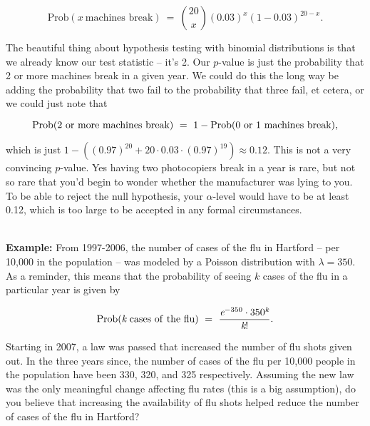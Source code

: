 \begin{equation*}

\textrm{Prob}(x \ \textrm{machines \ break}) \ = \  {{20}\choose{x}}(0.03)^x(1-0.03)^{20-x}.

\end{equation*}



The beautiful thing about hypothesis testing with binomial distributions is that we already know our test statistic -- it's 2.  Our $p$-value is just the probability that 2 or more machines break in a given year.  We could do this the long way be adding the probability that two fail to the probability that three fail, et cetera, or we could just note that

\begin{equation*}

\rm{Prob}(2 \ or \ more \ machines \ break) \ = \  1 - \rm{Prob}(0 \ or \ 1 \ machines \ break),

\end{equation*}

which is just $1-\left((0.97)^{20} + 20\cdot 0.03 \cdot (0.97)^{19}\right) \approx 0.12$.  This is not a very convincing $p$-value.  Yes having two photocopiers break in a year is rare, but not so rare that you'd begin to wonder whether the manufacturer was lying to you.  To be able to reject the null hypothesis, your $\alpha$-level would have to be at least 0.12, which is too large to be accepted in any formal circumstances.



\ \\



\textbf{Example:} \ex From 1997-2006, the number of cases of the flu in Hartford -- per 10,000 in the population -- was modeled by a Poisson distribution with $\lambda = 350$.  As a reminder, this means that the probability of seeing $k$ cases of the flu in a particular year is given by

\begin{equation*}

\rm{Prob}(\emph{k} \ cases \ of \ the \ flu) \ = \  \frac{\emph{e}^{-350}\cdot 350^\emph{k}}{\emph{k}!}.

\end{equation*}

Starting in 2007, a law was passed that increased the number of flu shots given out.  In the three years since, the number of cases of the flu per 10,000 people in the population have been 330, 320, and 325 respectively.  Assuming the new law was the only meaningful change affecting flu rates (this is a big assumption), do you believe that increasing the availability of flu shots helped reduce the number of cases of the flu in Hartford?



